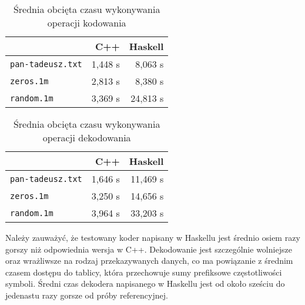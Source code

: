 \documentclass[../../thesis.tex]{subfiles}
\begin{document}
\begin{table}[h]
  \label{tab:encode-time}
  \caption{Średnia obcięta czasu wykonywania operacji kodowania}
  \centering
  \begin{tabular}{| l | r | r |}
    \hline
    & C++ & Haskell \\ \hline
    \texttt{pan-tadeusz.txt} & 1,448 s & 8,063 s\\ \hline
    \texttt{zeros.1m} & 2,813 s & 8,380 s\\ \hline
    \texttt{random.1m} & 3,369 s & 24,813 s\\ \hline
  \end{tabular}
\end{table}

\begin{table}[h]
  \label{tab:decode-time}
  \caption{Średnia obcięta czasu wykonywania operacji dekodowania}
  \centering
  \begin{tabular}{| l | r | r |}
    \hline
    & C++ & Haskell \\ \hline
    \texttt{pan-tadeusz.txt} & 1,646 s & 11,469 s \\ \hline
    \texttt{zeros.1m} & 3,250 s & 14,656 s\\ \hline
    \texttt{random.1m} & 3,964 s & 33,203 s\\ \hline
  \end{tabular}
\end{table}

Należy zauważyć, że testowany koder napisany w Haskellu
jest średnio osiem razy gorszy niż odpowiednia wersja w C++.
Dekodowanie jest szczególnie wolniejsze oraz wrażliwsze 
na rodzaj przekazywanych danych, co ma powiązanie z 
średnim czasem dostępu do tablicy, która przechowuje
sumy prefiksowe częstotliwości symboli. Średni czas
dekodera napisanego w Haskellu jest od około sześciu 
do jedenastu razy gorsze od próby referencyjnej.
\end{document}
